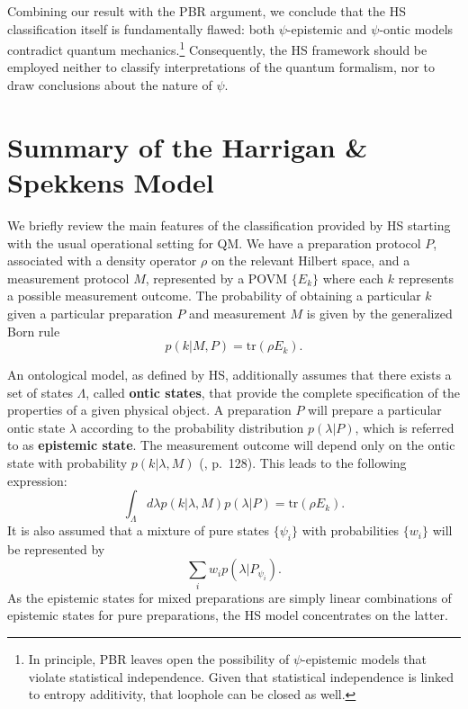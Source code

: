 \documentclass[10pt,twocolumn, nofootinbib]{revtex4-2}
\begin{document}
Combining our result with the PBR argument, we conclude that the HS classification itself is fundamentally flawed: both $\psi$-epistemic and $\psi$-ontic models contradict quantum mechanics.\footnote{In principle, PBR leaves open the possibility of $\psi$-epistemic models that violate statistical independence. Given that statistical independence is linked to entropy additivity, that loophole can be closed as well.} Consequently, the HS framework should be employed neither to classify interpretations of the quantum formalism, nor to draw conclusions about the nature of $\psi$. 

\section{Summary of the Harrigan \& Spekkens Model}

We briefly review the main features of the classification provided by HS starting with the usual operational setting for QM. We have a preparation protocol $P$, associated with a density operator $\rho$ on the relevant Hilbert space, and a measurement protocol $M$, represented by a POVM $\{ E_k\}$ where each $k$ represents a possible measurement outcome. The probability of obtaining a particular $k$ given a particular preparation $P$ and measurement $M$ is given by the generalized Born rule
\begin{equation}
	p(k|M, P)=\textrm{tr}(\rho E_k).
\end{equation}

An ontological model, as defined by HS, additionally assumes that there exists a set of states $\Lambda$, called \textbf{ontic states}, that provide the complete specification of the properties of a given physical object. A preparation $P$ will prepare a particular ontic state $\lambda$ according to the probability distribution $p(\lambda | P)$, which is referred to as \textbf{epistemic state}. The measurement outcome will depend only on the ontic state with probability $p(k|\lambda, M)$ (\cite{Harrigan:2010}, p.\ 128). This leads to the following expression:
\begin{equation}
	\int_\Lambda d\lambda p(k|\lambda, M) p(\lambda| P)= \textrm{tr}(\rho E_k).
\end{equation}
It is also assumed that a mixture of pure states $\{ \psi_i \}$ with probabilities $\{ w_i \}$ will be represented by
\begin{equation}\label{epistemic_mixing}
	\sum_i  w_i p(\lambda| P_{\psi_i}).
\end{equation}
As the epistemic states for mixed preparations are simply linear combinations of epistemic states for pure preparations, the HS model concentrates on the latter.
\end{document}
